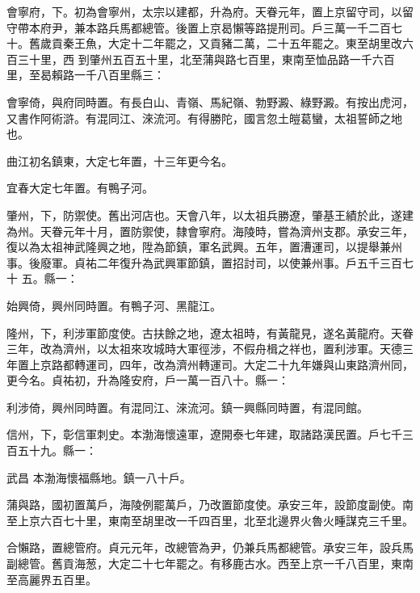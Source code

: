 \begin{pinyinscope}
 會寧府，下。初為會寧州，太宗以建都，升為府。天眷元年，置上京留守司，以留守帶本府尹，兼本路兵馬都總管。後置上京曷懶等路提刑司。戶三萬一千二百七十。舊歲貢秦王魚，大定十二年罷之，又貢豬二萬，二十五年罷之。東至胡里改六百三十里，西
 到肇州五百五十里，北至蒲與路七百里，東南至恤品路一千六百里，至曷賴路一千八百里縣三：



 會寧倚，與府同時置。有長白山、青嶺、馬紀嶺、勃野澱、綠野澱。有按出虎河，又書作阿術滸。有混同江、淶流河。有得勝陀，國言忽土皚葛蠻，太祖誓師之地也。



 曲江初名鎮東，大定七年置，十三年更今名。



 宜春大定七年置。有鴨子河。



 肇州，下，防禦使。舊出河店也。天會八年，以太祖兵勝遼，肇基王績於此，遂建為州。天眷元年十月，置防禦使，隸會寧府。海陵時，嘗為濟州支郡。承安三年，復以為太祖神武隆興之地，陞為節鎮，軍名武興。五年，置漕運司，以提舉兼州事。後廢軍。貞祐二年復升為武興軍節鎮，置招討司，以使兼州事。戶五千三百七十
 五。縣一：



 始興倚，興州同時置。有鴨子河、黑龍江。



 隆州，下，利涉軍節度使。古扶餘之地，遼太祖時，有黃龍見，遂名黃龍府。天眷三年，改為濟州，以太祖來攻城時大軍徑涉，不假舟楫之祥也，置利涉軍。天德三年置上京路都轉運司，四年，改為濟州轉運司。大定二十九年嫌與山東路濟州同，更今名。貞祐初，升為隆安府，戶一萬一百八十。縣一：



 利涉倚，興州同時置。有混同江、淶流河。鎮一興縣同時置，有混同館。



 信州，下，彰信軍刺史。本渤海懷遠軍，遼開泰七年建，取諸路漢民置。戶七千三百五十九。縣一：



 武昌
 本渤海懷福縣地。鎮一八十戶。



 蒲與路，國初置萬戶，海陵例罷萬戶，乃改置節度使。承安三年，設節度副使。南至上京六百七十里，東南至胡里改一千四百里，北至北邊界火魯火畽謀克三千里。



 合懶路，置總管府。貞元元年，改總管為尹，仍兼兵馬都總管。承安三年，設兵馬副總管。舊貢海葱，大定二十七年罷之。有移鹿古水。西至上京一千八百里，東南至高麗界五百里。




\end{pinyinscope}
